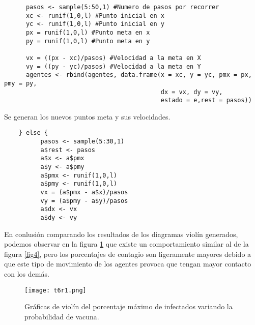 \documentclass[12pt]{amsart}
\begin{document}
\renewcommand{\listingscaption}{Código}
\begin{listing}[H]
  \begin{verbatim}
      pasos <- sample(5:50,1) #Numero de pasos por recorrer
      xc <- runif(1,0,l) #Punto inicial en x
      yc <- runif(1,0,l) #Punto inicial en y
      px = runif(1,0,l) #Punto meta en x
      py = runif(1,0,l) #Punto meta en y
      
      vx = ((px - xc)/pasos) #Velocidad a la meta en X
      vy = ((py - yc)/pasos) #Velocidad a la meta en Y
      agentes <- rbind(agentes, data.frame(x = xc, y = yc, pmx = px, pmy = py,
                                           dx = vx, dy = vy,
                                           estado = e,rest = pasos))
  \end{verbatim}
  \label{codigo5}
\end{listing}
\clearpage
Se generan los nuevos puntos meta y sus velocidades.
\renewcommand{\listingscaption}{Código}
\begin{listing}[H]
  \begin{verbatim}
    } else {
          pasos <- sample(5:30,1)
          a$rest <- pasos
          a$x <- a$pmx
          a$y <- a$pmy
          a$pmx <- runif(1,0,l)
          a$pmy <- runif(1,0,l)
          vx = (a$pmx - a$x)/pasos
          vy = (a$pmy - a$y)/pasos
          a$dx <- vx
          a$dy <- vy
  \end{verbatim}
  \label{codigo5}
\end{listing}

En conlusión comparando los resultados de los diagramas violín generados, podemos observar en la figura \ref{fig5} que existe un comportamiento similar al de la figura \ref{fig4}, pero los porcentajes de contagio son ligeramente mayores debido a que este tipo de movimiento de los agentes provoca que tengan mayor contacto con los demás. 
\begin{figure} [h!]
    \centering
    \texttt{[image: t6r1.png]}
    \caption{Gráficas de violín del porcentaje máximo de infectados variando la probabilidad de vacuna.}
    \label{fig5}
\end{figure}
\clearpage
\end{document}
